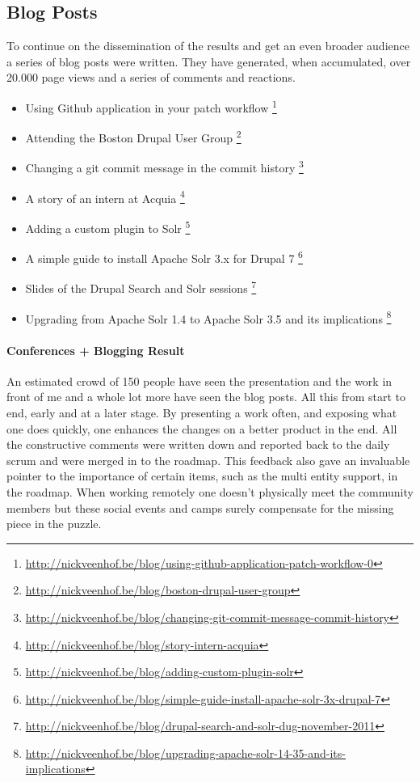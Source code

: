 \subsection{Blog Posts}
To continue on the dissemination of the results and get an even broader audience a series of blog posts were written. They have generated, when accumulated, over 20.000 page views and a series of comments and reactions.

\begin{itemize}
\item Using Github application in your patch workflow \footnote{\url{http://nickveenhof.be/blog/using-github-application-patch-workflow-0}} 
\item Attending the Boston Drupal User Group \footnote{\url{http://nickveenhof.be/blog/boston-drupal-user-group}} 
\item Changing a git commit message in the commit history \footnote{\url{http://nickveenhof.be/blog/changing-git-commit-message-commit-history}} 
\item A story of an intern at Acquia \footnote{\url{http://nickveenhof.be/blog/story-intern-acquia}} 
\item Adding a custom plugin to Solr \footnote{\url{http://nickveenhof.be/blog/adding-custom-plugin-solr}} 
\item A simple guide to install Apache Solr 3.x for Drupal 7 \footnote{\url{http://nickveenhof.be/blog/simple-guide-install-apache-solr-3x-drupal-7}} 
\item Slides of the Drupal Search and Solr sessions \footnote{\url{http://nickveenhof.be/blog/drupal-search-and-solr-dug-november-2011}} 
\item Upgrading from Apache Solr 1.4 to Apache Solr 3.5 and its implications \footnote{\url{http://nickveenhof.be/blog/upgrading-apache-solr-14-35-and-its-implications}} 
\end{itemize}

\paragraph{Conferences + Blogging Result}
An estimated crowd of 150 people have seen the presentation and the work in front of me and a whole lot more have seen the blog posts. All this from start to end, early and at a later stage. By presenting a work often, and exposing what one does quickly, one enhances the changes on a better product in the end. All the constructive comments were written down and reported back to the daily scrum and were merged in to the roadmap. This feedback also gave an invaluable pointer to the importance of certain items, such as the multi entity support, in the roadmap. When working remotely one doesn't physically meet the community members but these social events and camps surely compensate for the missing piece in the puzzle.


